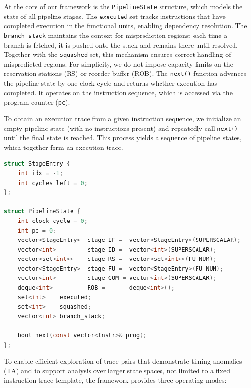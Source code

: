 At the core of our framework is the \texttt{PipelineState} structure, which models the state of all pipeline stages. The \texttt{executed} set tracks instructions that have completed execution in the functional units, enabling dependency resolution. The \texttt{branch\_stack} maintains the context for misprediction regions: each time a branch is fetched, it is pushed onto the stack and remains there until resolved. Together with the \texttt{squashed} set, this mechanism ensures correct handling of mispredicted regions. For simplicity, we do not impose capacity limits on the reservation stations (RS) or reorder buffer (ROB). The \texttt{next()} function advances the pipeline state by one clock cycle and returns whether execution has completed. It operates on the instruction sequence, which is accessed via the program counter (\texttt{pc}).

To obtain an execution trace from a given instruction sequence, we initialize an empty pipeline state (with no instructions present) and repeatedly call \texttt{next()} until the final state is reached. This process yields a sequence of pipeline states, which together form an execution trace.

\begin{lstlisting}[language=C]
struct StageEntry {
    int idx = -1;
    int cycles_left = 0;
};

struct PipelineState {
    int clock_cycle = 0;
    int pc = 0;
    vector<StageEntry> 	stage_IF = 	vector<StageEntry>(SUPERSCALAR);
    vector<int> 		stage_ID = 	vector<int>(SUPERSCALAR);
    vector<set<int>> 	stage_RS = 	vector<set<int>>(FU_NUM);
    vector<StageEntry> 	stage_FU = 	vector<StageEntry>(FU_NUM);
    vector<int> 		stage_COM = vector<int>(SUPERSCALAR);
    deque<int> 			ROB = 		deque<int>();
    set<int> 	executed;
    set<int> 	squashed;
    vector<int> branch_stack;

    bool next(const vector<Instr>& prog);
};
\end{lstlisting}

To enable efficient exploration of trace pairs that demonstrate timing anomalies (TA) and to support analysis over larger state spaces, not limited to a fixed instruction trace template, the framework provides three operating modes:

